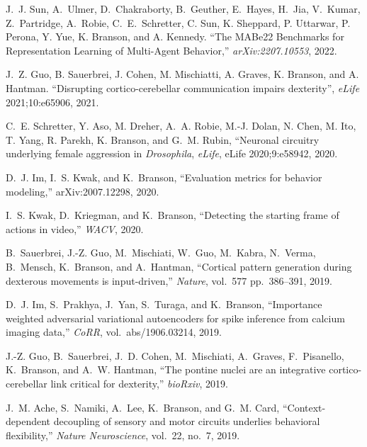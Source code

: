 \begin{cvenum}

\item 
J.~J. Sun, A.~Ulmer, D.~Chakraborty, B.~Geuther, E.~Hayes, H.~Jia, V.~Kumar, Z.~Partridge, A.~Robie, C.~E.~Schretter,  C. Sun, K. Sheppard, P. Uttarwar, P. Perona, Y. Yue, K. Branson, and A. Kennedy. ``The MABe22 Benchmarks for Representation Learning of Multi-Agent Behavior,'' {\em arXiv:2207.10553}, 2022. 

\item J.~Z. Guo, B. Sauerbrei, J. Cohen, M. Mischiatti, A. Graves, K. Branson, and A. Hantman. ``Disrupting cortico-cerebellar communication impairs dexterity'', {\em eLife} 2021;10:e65906, 2021.
  
\item C.~E. Schretter, Y. Aso, M. Dreher, A.~A. Robie, M.-J. Dolan, N. Chen, M. Ito, T. Yang, R. Parekh, K. Branson, and G.~M. Rubin, ``Neuronal circuitry underlying female aggression in {\em {{D}}rosophila}, {\em eLife}, eLife 2020;9:e58942, 2020.
  
\item D.~J. Im, I.~S. Kwak, and K.~Branson, ``Evaluation metrics for behavior modeling,'' arXiv:2007.12298, 2020.
  
\item I.~S. Kwak, D.~Kriegman, and K.~Branson, ``Detecting the starting frame of actions in video,'' {\em WACV}, 2020.

\item B.~Sauerbrei, J.-Z. Guo, M.~Mischiati, W.~Guo, M.~Kabra, N.~Verma, B.~Mensch, K.~Branson, and A.~Hantman, ``Cortical pattern generation during dexterous movements is input-driven,'' {\em Nature}, vol.~577 pp.~386--391, 2019.

\item D.~J. Im, S.~Prakhya, J.~Yan, S.~Turaga, and K.~Branson, ``Importance weighted
  adversarial variational autoencoders for spike inference from calcium imaging
  data,'' {\em CoRR}, vol.~abs/1906.03214, 2019.

\item J.-Z. Guo, B.~Sauerbrei, J.~D. Cohen, M.~Mischiati, A.~Graves, F.~Pisanello,
  K.~Branson, and A.~W. Hantman, ``The pontine nuclei are an integrative
  cortico-cerebellar link critical for dexterity,'' {\em bioRxiv}, 2019.

\item J.~M. Ache, S.~Namiki, A.~Lee, K.~Branson, and G.~M. Card, ``Context-dependent
  decoupling of sensory and motor circuits underlies behavioral flexibility,''
  {\em Nature Neuroscience}, vol.~22, no.~7, 2019.


\end{cvenum}
